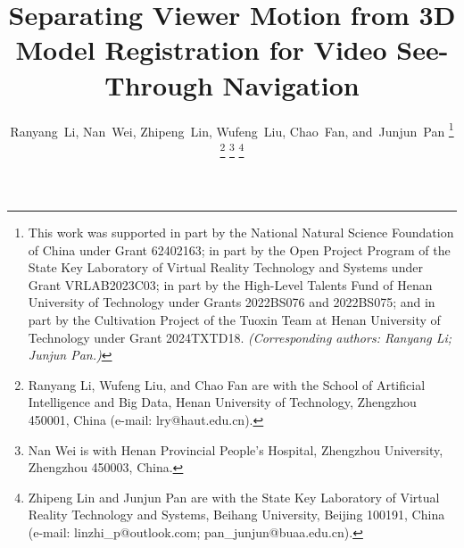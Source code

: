 \documentclass[journal]{IEEEtran}
\begin{document}
\title{Separating Viewer Motion from 3D Model Registration for Video See-Through Navigation}

\author{Ranyang~Li,
        Nan~Wei,
        Zhipeng~Lin,
        Wufeng~Liu,
        Chao~Fan,
        and~Junjun~Pan%
\thanks{This work was supported in part by the National Natural Science Foundation of China under Grant 62402163; in part by the Open Project Program of the State Key Laboratory of Virtual Reality Technology and Systems under Grant VRLAB2023C03; in part by the High-Level Talents Fund of Henan University of Technology under Grants 2022BS076 and 2022BS075; and in part by the Cultivation Project of the Tuoxin Team at Henan University of Technology under Grant 2024TXTD18. \emph{(Corresponding authors: Ranyang Li; Junjun Pan.)}}%
\thanks{Ranyang Li, Wufeng Liu, and Chao Fan are with the School of Artificial Intelligence and Big Data, Henan University of Technology, Zhengzhou 450001, China (e-mail: lry@haut.edu.cn).}%
\thanks{Nan Wei is with Henan Provincial People's Hospital, Zhengzhou University, Zhengzhou 450003, China.}%
\thanks{Zhipeng Lin and Junjun Pan are with the State Key Laboratory of Virtual Reality Technology and Systems, Beihang University, Beijing 100191, China (e-mail: linzhi\_p@outlook.com; pan\_junjun@buaa.edu.cn).}%
}


\maketitle
\end{document}
